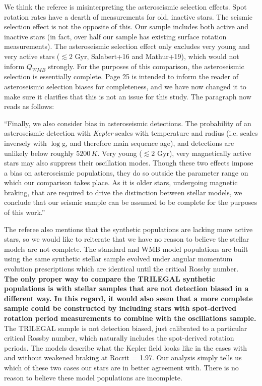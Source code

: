 \documentclass[11pt]{article}
\begin{document}
We think the referee is misinterpreting the asteroseismic selection effects. Spot rotation rates have a dearth of measurements for old, inactive stars. The seismic selection effect is not the opposite of this. Our sample includes both active and inactive stars (in fact, over half our sample has existing surface rotation measurements). The asteroseismic selection effect only excludes very young and very active stars ($\lesssim 2$ Gyr, Salabert+16 and Mathur+19), which would not inform $Q_{WMB}$ strongly. For the purposes of this comparison, the asteroseismic selection is essentially complete. Page 25 is intended to inform the reader of asteroseismic selection biases for completeness, and we have now changed it to make sure it clarifies that this is not an issue for this study. The paragraph now reads as follows:

“Finally, we also consider bias in asteroseismic detections. The probability of an asteroseismic detection with \textit{Kepler} scales with temperature and radius (i.e. scales inversely with $\log$g, and therefore main sequence age), and detections are unlikely below roughly $5200\, K$. Very young ($\lesssim 2$ Gyr), very magnetically active stars may also suppress their oscillation modes. Though these two effects impose a bias on asteroseismic populations, they do so outside the parameter range on which our comparison takes place. As it is older stars, undergoing magnetic braking, that are required to drive the distinction between stellar models, we conclude that our seismic sample can be assumed to be complete for the purposes of this work.”

The referee also mentions that the synthetic populations are lacking more active stars, so we would like to reiterate that we have no reason to believe the stellar models are not complete. The standard and WMB model populations are built using the same synthetic stellar sample evolved under angular momentum evolution prescriptions which are identical until the critical Rossby number.\\

\noindent\textbf{The only proper way to compare the TRILEGAL synthetic populations is with stellar samples that are not detection biased in a different way.  In this regard, it would also seem that a more complete sample could be constructed by including stars with spot-derived rotation period measurements to combine with the oscillations sample.}\\

The TRILEGAL sample is not detection biased, just calibrated to a particular critical Rossby number, which naturally includes the spot-derived rotation periods. The models describe what the Kepler field looks like in the cases with and without weakened braking at Rocrit = 1.97. Our analysis simply tells us which of these two cases our stars are in better agreement with. There is no reason to believe these model populations are incomplete.
\end{document}

